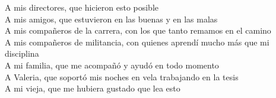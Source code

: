 \newcommand{\dedicatoria}[1]{\hfill #1\\}


\dedicatoria{A mis directores, que hicieron esto posible}

\dedicatoria{A mis amigos, que estuvieron en las buenas y en las malas}

\dedicatoria{A mis compañeros de la carrera, con los que tanto remamos en el camino}

\dedicatoria{A mis compañeros de militancia, con quienes aprendí mucho más que mi disciplina}

\dedicatoria{A mi familia, que me acompañó y ayudó en todo momento}

\dedicatoria{A Valeria, que soportó mis noches en vela trabajando en la tesis}

\dedicatoria{A mi vieja, que me hubiera gustado que lea esto}